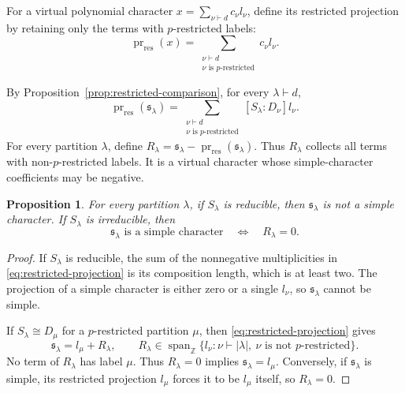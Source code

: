 \documentclass[12pt,reqno,a4paper]{amsart}
\numberwithin{equation}{section}
\numberwithin{figure}{section}
\theoremstyle{plain}
\newtheorem{proposition}[theorem]{Proposition}
\theoremstyle{definition}
\begin{document}
For a virtual polynomial character
$x=\sum_{\nu\vdash d}c_\nu l_\nu$, define its restricted projection
by retaining only the terms with $p$-restricted labels:
\begin{equation}\label{eq:restricted-projection-operator}
\operatorname{pr}_{\mathrm{res}}(x)
=\sum_{\substack{\nu\vdash d\\\nu\text{ is }p\text{-restricted}}}
c_\nu l_\nu.
\end{equation}

By Proposition~\ref{prop:restricted-comparison}, for every
$\lambda\vdash d$,
\begin{equation}\label{eq:restricted-projection}
\operatorname{pr}_{\mathrm{res}}(\mathfrak{s}_\lambda)
=\sum_{\substack{\nu\vdash d\\\nu\text{ is }p\text{-restricted}}}
[S_\lambda:D_\nu]l_\nu.
\end{equation}
For every partition $\lambda$, define
$R_\lambda=\mathfrak{s}_\lambda-
\operatorname{pr}_{\mathrm{res}}(\mathfrak{s}_\lambda)$.
Thus $R_\lambda$ collects all terms with non-$p$-restricted labels.
It is a virtual character whose simple-character coefficients may be negative.

\begin{proposition}
\label{prop:restricted-projection}
For every partition $\lambda$, if $S_\lambda$ is reducible, then
$\mathfrak{s}_\lambda$ is not a simple character.  If $S_\lambda$
is irreducible, then
\[
\mathfrak{s}_\lambda\text{ is a simple character}
\quad\Longleftrightarrow\quad R_\lambda=0.
\]
\end{proposition}

\begin{proof}
If $S_\lambda$ is reducible, the sum of the nonnegative
multiplicities in \eqref{eq:restricted-projection} is its composition
length, which is at least two.  The projection of a simple character
is either zero or a single $l_\nu$, so
$\mathfrak{s}_\lambda$ cannot be simple.

If $S_\lambda\cong D_\mu$ for a $p$-restricted partition $\mu$, then
\eqref{eq:restricted-projection} gives
\begin{equation}\label{eq:remainder}
\mathfrak{s}_\lambda=l_\mu+R_\lambda,
\qquad
R_\lambda\in
\operatorname{span}_{\mathbb Z}
\{l_\nu:\nu\vdash|\lambda|,\ \nu\text{ is not }p\text{-restricted}\}.
\end{equation}
No term of $R_\lambda$ has label $\mu$.
Thus $R_\lambda=0$ implies $\mathfrak{s}_\lambda=l_\mu$.
Conversely, if $\mathfrak{s}_\lambda$ is simple, its restricted
projection $l_\mu$ forces it to be $l_\mu$ itself, so
$R_\lambda=0$.
\end{proof}
\end{document}
